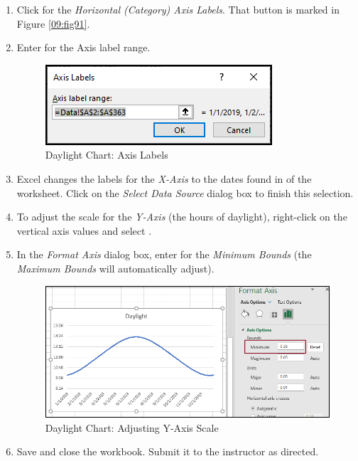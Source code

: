 \begin{enumerate}
	\item Click  for the \textit{Horizontal (Category) Axis Labels}. That button is marked in Figure \ref{09:fig91}.
	\item Enter  for the Axis label range.
	
	\begin{figure}[H]
		\centering
		\includegraphics[width=\maxwidth{.75\linewidth}]{gfx/ch09_fig92}
		\caption{Daylight Chart: Axis Labels}
		\label{09:fig92}
	\end{figure}
	
	\item Excel changes the labels for the \textit{X-Axis} to the dates found in  of the  worksheet. Click  on the \textit{Select Data Source} dialog box to finish this selection.
	\item To adjust the scale for the \textit{Y-Axis} (the hours of daylight), right-click on the vertical axis values and select .
	\item In the \textit{Format Axis} dialog box, enter  for the \textit{Minimum Bounds} (the \textit{Maximum Bounds} will automatically adjust).
	
	\begin{figure}[H]
		\centering
		\includegraphics[width=\maxwidth{.95\linewidth}]{gfx/ch09_fig93}
		\caption{Daylight Chart: Adjusting Y-Axis Scale}
		\label{09:fig93}
	\end{figure}
	
	\item Save and close the  workbook. Submit it to the instructor as directed.
\end{enumerate}





	


